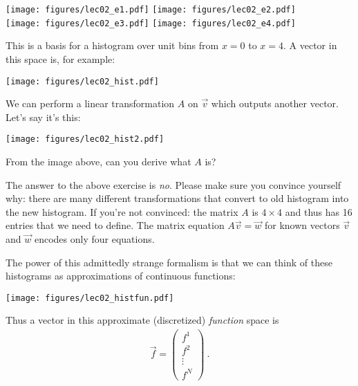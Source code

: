 \begin{center}
\texttt{[image: figures/lec02\_e1.pdf]}
\texttt{[image: figures/lec02\_e2.pdf]}\\
\texttt{[image: figures/lec02\_e3.pdf]}
\texttt{[image: figures/lec02\_e4.pdf]}
\end{center}

\noindent This is a basis for a histogram over unit bins from $x=0$ to $x=4$. A vector in this space is, for example:

\begin{center}
\texttt{[image: figures/lec02\_hist.pdf]}
\end{center}

\noindent We can perform a linear transformation $A$ on $\vec{v}$ which outputs another vector. Let’s say it’s this:


\begin{center}
\texttt{[image: figures/lec02\_hist2.pdf]}
\end{center}

\begin{exercise}
From the image above, can you derive what $A$ is? 
\end{exercise}

\noindent The answer to the above exercise is \emph{no}. Please make sure you convince yourself why: there are many different transformations that convert to old histogram into the new histogram. If you're not convinced: the matrix $A$ is $4\times 4$ and thus has 16 entries that we need to define. The matrix equation $A\vec{v} = \vec{w}$ for known vectors $\vec{v}$ and $\vec{w}$ encodes only four equations.

The power of this admittedly strange formalism is that we can think of these histograms as approximations of continuous functions:

\begin{center}
\texttt{[image: figures/lec02\_histfun.pdf]}
\end{center}

Thus a vector in this approximate (discretized) \emph{function} space is 
\begin{align}
  \vec{f} = 
  \begin{pmatrix}
    f^1 \\
    f^2 \\
    \vdots\\
    f^N
  \end{pmatrix} \ .
\end{align}

